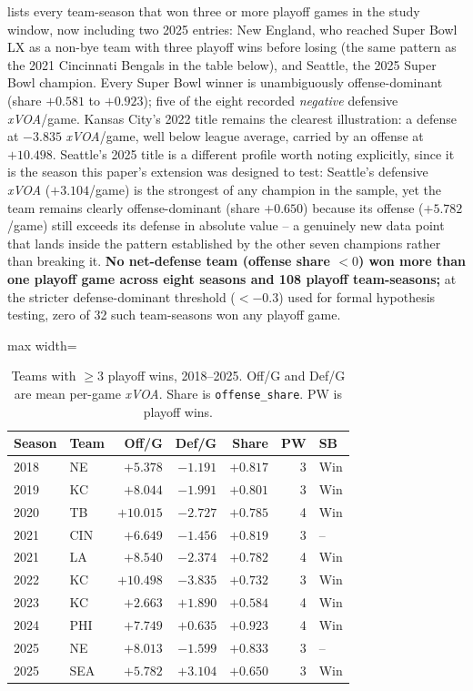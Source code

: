\documentclass[12pt,a4paper]{article}
\newcommand{\xvoa}{\textit{xVOA}}
\begin{document}
 lists every team-season that won three or more playoff games in the study window, now including two 2025 entries: New England, who reached Super Bowl LX as a non-bye team with three playoff wins before losing (the same pattern as the 2021 Cincinnati Bengals in the table below), and Seattle, the 2025 Super Bowl champion. Every Super Bowl winner is unambiguously offense-dominant (share $+0.581$ to $+0.923$); five of the eight recorded \emph{negative} defensive \xvoa{}/game. Kansas City's 2022 title remains the clearest illustration: a defense at $-3.835$ \xvoa{}/game, well below league average, carried by an offense at $+10.498$. Seattle's 2025 title is a different profile worth noting explicitly, since it is the season this paper's extension was designed to test: Seattle's defensive \xvoa{} ($+3.104$/game) is the strongest of any champion in the sample, yet the team remains clearly offense-dominant (share $+0.650$) because its offense ($+5.782$/game) still exceeds its defense in absolute value -- a genuinely new data point that lands inside the pattern established by the other seven champions rather than breaking it. \textbf{No net-defense team (offense share $<0$) won more than one playoff game across eight seasons and 108 playoff team-seasons;} at the stricter defense-dominant threshold ($<-0.3$) used for formal hypothesis testing, zero of 32 such team-seasons won any playoff game.

\begin{table}[htbp]
  \centering
  \caption{Teams with $\geq 3$ playoff wins, 2018--2025. Off/G and Def/G are mean per-game \xvoa{}. Share is \texttt{offense\_share}. PW is playoff wins.}
  \label{tab:sb-participants}
  \begin{adjustbox}{max width=\textwidth}
  \begin{tabular}{llrrrrl}
    \toprule
    \textbf{Season} & \textbf{Team} & \textbf{Off/G} & \textbf{Def/G} & \textbf{Share} & \textbf{PW} & \textbf{SB} \\
    \midrule
    2018 & NE   & $+5.378$  & $-1.191$ & $+0.817$ & 3 & Win \\
    2019 & KC   & $+8.044$  & $-1.991$ & $+0.801$ & 3 & Win \\
    2020 & TB   & $+10.015$ & $-2.727$ & $+0.785$ & 4 & Win \\
    2021 & CIN  & $+6.649$  & $-1.456$ & $+0.819$ & 3 &  -- \\
    2021 & LA   & $+8.540$  & $-2.374$ & $+0.782$ & 4 & Win \\
    2022 & KC   & $+10.498$ & $-3.835$ & $+0.732$ & 3 & Win \\
    2023 & KC   & $+2.663$  & $+1.890$ & $+0.584$ & 4 & Win \\
    2024 & PHI  & $+7.749$  & $+0.635$ & $+0.923$ & 4 & Win \\
    2025 & NE   & $+8.013$  & $-1.599$ & $+0.833$ & 3 &  -- \\
    2025 & SEA  & $+5.782$  & $+3.104$ & $+0.650$ & 3 & Win \\
    \bottomrule
  \end{tabular}
  \end{adjustbox}
\end{table}
\end{document}
